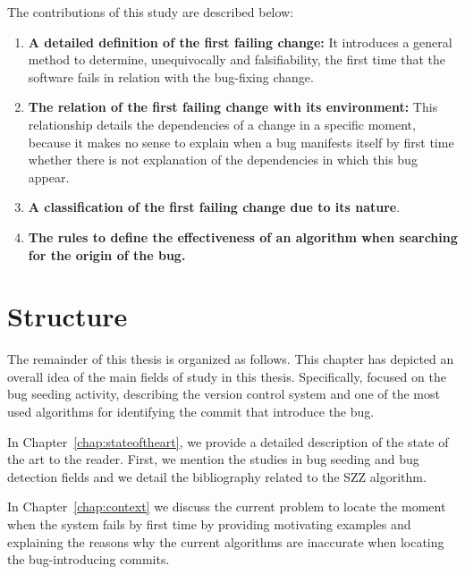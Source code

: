 \documentclass[a4paper, 12pt]{book}
\begin{document}
The contributions of this study are described below:
\begin{enumerate}
  \item \textbf{A detailed definition of the first failing change:} It introduces a general method to determine, unequivocally and falsifiability, the first time that the software fails in relation with the bug-fixing change.
  \item \textbf{The relation of the first failing change with its environment:} This relationship details the dependencies of a change in a specific moment, because it makes no sense to explain when a bug manifests itself by first time whether there is not explanation of the dependencies in which this bug appear.
  \item \textbf{A classification of the first failing change due to its nature}.
  \item \textbf{The rules to define the effectiveness of an algorithm when searching for the origin of the bug.}
\end{enumerate}



\section{Structure}
\label{subsec:structure}
The remainder of this thesis is organized as follows. This chapter has depicted an overall idea of the main fields of study in this thesis. Specifically, focused on the bug seeding activity, describing the version control system and one of the most used algorithms for identifying the commit that introduce the bug.

In Chapter~\ref{chap:stateoftheart}, we provide a detailed description of the state of the art to the reader. First, we mention the studies in bug seeding and bug detection fields and we detail the bibliography related to the SZZ algorithm.

In Chapter~\ref{chap:context} we discuss the current problem to locate the moment when the system fails by first time by providing motivating examples and explaining the reasons why the current algorithms are inaccurate when locating the bug-introducing commits.
\end{document}
